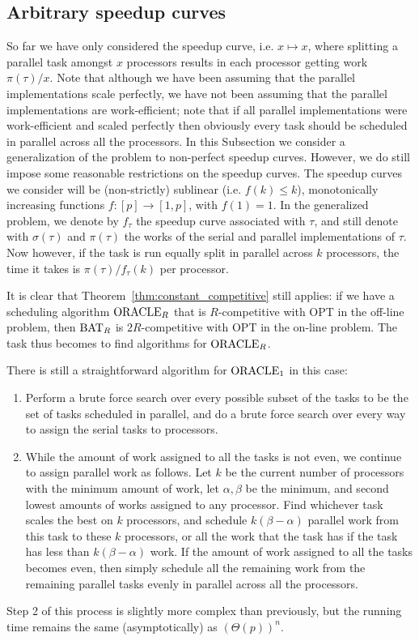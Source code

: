 \subsection{Arbitrary speedup curves} 
So far we have only considered the  speedup curve,
i.e. $x\mapsto x$, where splitting a parallel task amongst $x$
processors results in each processor getting work $\pi(\tau)/x$.
Note that although we have been assuming that the parallel
implementations scale perfectly, we have not been assuming that
the parallel implementations are work-efficient; note that if all
parallel implementations were work-efficient and scaled perfectly
then obviously every task should be scheduled in parallel across
all the processors. In this Subsection we consider a
generalization of the problem to non-perfect speedup curves.
However, we do still impose some reasonable restrictions on the
speedup curves. The speedup curves we consider will be
(non-strictly) sublinear (i.e. $f(k) \le k$),
monotonically increasing functions $f: [p] \to [1,p]$, with $f(1)
= 1$. In the generalized problem, we denote by $f_\tau$ the
speedup curve associated with $\tau$, and still denote with
$\sigma(\tau)$ and $\pi(\tau)$ the works of the serial and
parallel implementations of $\tau$. Now however, if the task is
run equally split in parallel across $k$ processors, the time it
takes is $\pi(\tau) / f_\tau(k)$ per processor.

It is clear that Theorem~\ref{thm:constant_competitive} still
applies: if we have a scheduling algorithm $\operatorname{\text{ORACLE}}_R$ that is
$R$-competitive with OPT in the off-line problem, then $\operatorname{\text{BAT}}_R$
is $2R$-competitive with OPT in the on-line problem. The task
thus becomes to find algorithms for $\operatorname{\text{ORACLE}}_R$.

There is still a straightforward algorithm for $\operatorname{\text{ORACLE}}_1$ in
this case:
\begin{enumerate}
  \item Perform a brute force search over every
possible subset of the tasks to be the set of tasks scheduled in
parallel, and do a brute force search over every way to assign
the serial tasks to processors. 

\item While the amount of work assigned to all the tasks is not
  even, we continue to assign parallel work as follows. Let $k$
  be the current number of processors with the minimum amount of
  work, let $\alpha, \beta$ be the minimum, and second lowest
  amounts of works assigned to any processor. Find whichever task
  scales the best on $k$ processors, and schedule $k(\beta -
  \alpha)$ parallel work from this task to these $k$ processors,
  or all the work that the task has if the task has less than
  $k(\beta-\alpha)$ work. If the amount of work assigned to all
  the tasks becomes even, then simply schedule all the remaining
  work from the remaining parallel tasks evenly in parallel
  across all the processors.
\end{enumerate}
Step 2 of this process is slightly more complex than previously,
but the running time remains the same (asymptotically) as
$(\Theta(p))^n$.

